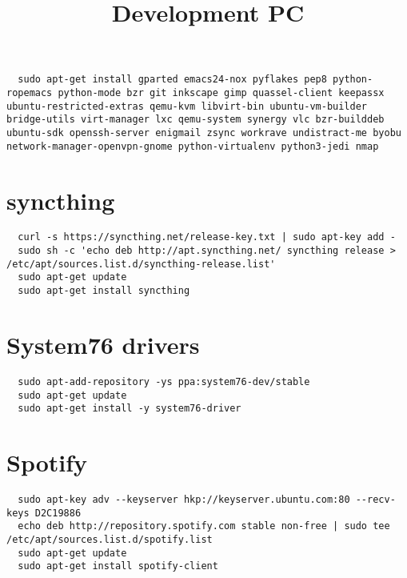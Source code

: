 \documentclass[12pt]{article}
\title{Development PC}
\begin{document}
\begin{verbatim}
  sudo apt-get install gparted emacs24-nox pyflakes pep8 python-ropemacs python-mode bzr git inkscape gimp quassel-client keepassx ubuntu-restricted-extras qemu-kvm libvirt-bin ubuntu-vm-builder bridge-utils virt-manager lxc qemu-system synergy vlc bzr-builddeb ubuntu-sdk openssh-server enigmail zsync workrave undistract-me byobu network-manager-openvpn-gnome python-virtualenv python3-jedi nmap
\end{verbatim}

\section{syncthing}

\begin{verbatim}
  curl -s https://syncthing.net/release-key.txt | sudo apt-key add -
  sudo sh -c 'echo deb http://apt.syncthing.net/ syncthing release > /etc/apt/sources.list.d/syncthing-release.list'
  sudo apt-get update
  sudo apt-get install syncthing
\end{verbatim}

\section{System76 drivers}

\begin{verbatim}
  sudo apt-add-repository -ys ppa:system76-dev/stable
  sudo apt-get update
  sudo apt-get install -y system76-driver
\end{verbatim}

\section{Spotify}

\begin{verbatim}
  sudo apt-key adv --keyserver hkp://keyserver.ubuntu.com:80 --recv-keys D2C19886
  echo deb http://repository.spotify.com stable non-free | sudo tee /etc/apt/sources.list.d/spotify.list
  sudo apt-get update
  sudo apt-get install spotify-client
\end{verbatim}
\end{document}
